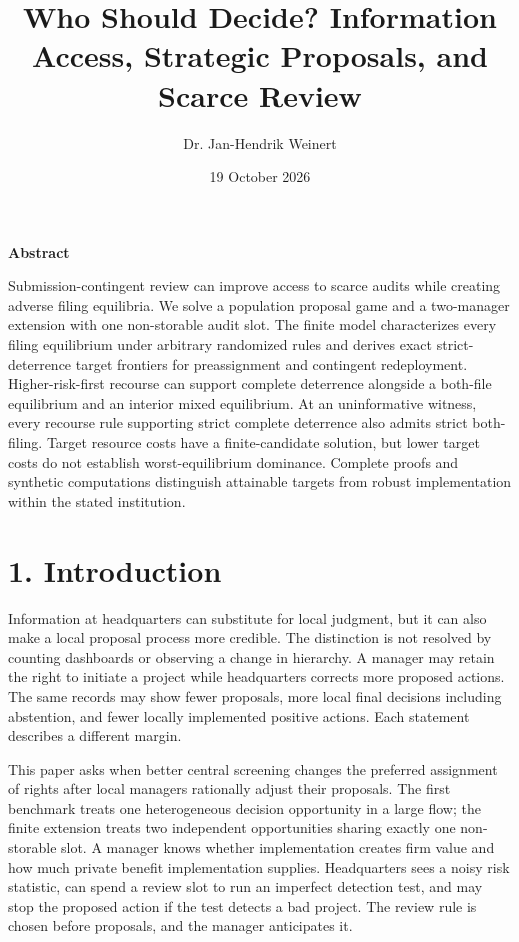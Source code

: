 \documentclass[
  11pt,
]{article}
\title{Who Should Decide? Information Access, Strategic Proposals, and
Scarce Review}
\author{Dr. Jan-Hendrik Weinert}
\date{19 October 2026}
\makeatletter
\renewcommand{\maketitle}{%
  \begin{center}
  {\LARGE\bfseries\@title\par}
  \vspace{0.8em}
  {\normalsize\@author\par}
  \vspace{0.35em}
  {\small\@date\par}
  \end{center}
  \vspace{0.4em}}
\renewenvironment{abstract}{%
  \begin{center}\small\bfseries Abstract\end{center}
  \begin{list}{}{\setlength{\leftmargin}{0.5in}\setlength{\rightmargin}{0.5in}}
  \item[]\small\setlength{\parindent}{0pt}\ignorespaces
}{\end{list}\vspace{0.6em}}
\makeatother
\begin{document}
\maketitle
\begin{abstract}
Submission-contingent review can improve access to scarce audits while creating adverse filing equilibria. We solve a population proposal game and a two-manager extension with one non-storable audit slot. The finite model characterizes every filing equilibrium under arbitrary randomized rules and derives exact strict-deterrence target frontiers for preassignment and contingent redeployment. Higher-risk-first recourse can support complete deterrence alongside a both-file equilibrium and an interior mixed equilibrium. At an uninformative witness, every recourse rule supporting strict complete deterrence also admits strict both-filing. Target resource costs have a finite-candidate solution, but lower target costs do not establish worst-equilibrium dominance. Complete proofs and synthetic computations distinguish attainable targets from robust implementation within the stated institution.
\end{abstract}
\section{1. Introduction}\label{introduction}

Information at headquarters can substitute for local judgment, but it
can also make a local proposal process more credible. The distinction is
not resolved by counting dashboards or observing a change in hierarchy.
A manager may retain the right to initiate a project while headquarters
corrects more proposed actions. The same records may show fewer
proposals, more local final decisions including abstention, and fewer
locally implemented positive actions. Each statement describes a
different margin.

This paper asks when better central screening changes the preferred
assignment of rights after local managers rationally adjust their
proposals. The first benchmark treats one heterogeneous decision
opportunity in a large flow; the finite extension treats two independent
opportunities sharing exactly one non-storable slot. A manager knows
whether implementation creates firm value and how much private benefit
implementation supplies. Headquarters sees a noisy risk statistic, can
spend a review slot to run an imperfect detection test, and may stop the
proposed action if the test detects a bad project. The review rule is
chosen before proposals, and the manager anticipates it.
\end{document}
